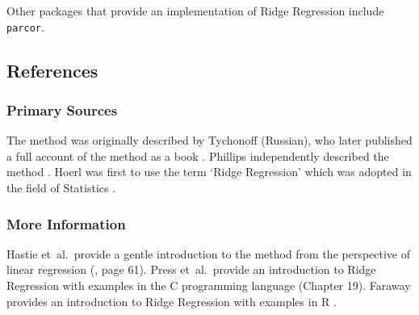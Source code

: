 Other packages that provide an implementation of Ridge Regression include \texttt{parcor}.

\subsection{References}

\subsubsection{Primary Sources}
The method was originally described by Tychonoff \cite{Tikhonov1943, Tikhonov1963} (Russian), who later published a full account of the method as a book \cite{Tikhonov1977}.
Phillips independently described the method \cite{Phillips1962}. Hoerl was first to use the term `Ridge Regression' which was adopted in the field of Statistics \cite{Hoerl1962, Hoerl1970, Hoerl1970a}.

\subsubsection{More Information}
Hastie et~al.\ provide a gentle introduction to the method from the perspective of linear regression (\cite{Hastie2009}, page 61).
Press et~al.\ provide an introduction to Ridge Regression with examples in the C programming language \cite{Press2007} (Chapter 19).
Faraway provides an introduction to Ridge Regression with examples in R \cite{Faraway2002}.

